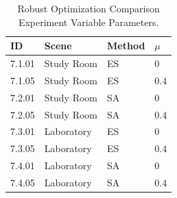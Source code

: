 \begin{table}[ht]
\centering
\caption{Robust Optimization Comparison Experiment Variable Parameters.}
\label{tab:robust_comparison_params}
\begin{tabular}{@{}llll@{}}
\hline
    \textbf{ID} & \textbf{Scene} & \textbf{Method} & \textbf{$\mu$} \\
\hline
    7.1.01 & Study Room & ES & $0$ \\
    7.1.05 & Study Room & ES & $0.4$ \\
    \noalign{\smallskip}
    7.2.01 & Study Room & SA & $0$ \\
    7.2.05 & Study Room & SA & $0.4$ \\
    \noalign{\smallskip}
    7.3.01 & Laboratory & ES & $0$ \\
    7.3.05 & Laboratory & ES & $0.4$ \\
    \noalign{\smallskip}
    7.4.01 & Laboratory & SA & $0$ \\
    7.4.05 & Laboratory & SA & $0.4$ \\
\hline
\end{tabular}
\end{table}